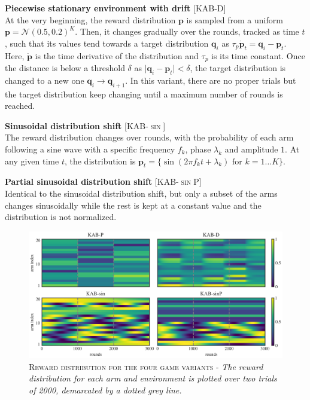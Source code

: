 \hfill \break
\noindent \textbf{Piecewise stationary environment with drift} [\textsc{KAB-D}]\\ At the very beginning, the reward distribution $\mathbf{p}$ is sampled from a uniform $\mathbf{p}=\mathcal{N}(0.5, 0.2)^{K}$. Then, it changes gradually over the rounds, tracked as time $t$, such that its values tend towards a target distribution $\mathbf{q}_{i}$ as $\tau_{p}\dot{\mathbf{p}}_{t}=\mathbf{q}_{i}-\mathbf{p}_{t}$.
Here, $\dot{\mathbf{p}}$ is the time derivative of the distribution and $\tau_{p}$ is its time constant.
Once the distance is below a threshold $\delta$ as $\vert \mathbf{q}_{i} - \mathbf{p}_{t}\vert < \delta$, the target distribution is changed to a new one $\mathbf{q}_{i}\to\mathbf{q}_{i+1}$. In this variant, there are no proper trials but the target distribution keep changing until a maximum number
of rounds is reached.

\hfill \break
\noindent \textbf{Sinusoidal distribution shift} [\textsc{KAB-$\sin$}]\\ The reward distribution changes over rounds, with the probability of each arm following a sine wave with a specific frequency $f_{k}$, phase $\lambda_{k}$ and amplitude $1$. At any given time $t$, the distribution is $\mathbf{p}_{t}=\{\sin(2\pi f_{k} t+\lambda_{k})\text{  for }k=1\ldots K\}$.

\hfill \break
\noindent \textbf{Partial sinusoidal distribution shift} [\textsc{KAB-$\sin$P}]\\ Identical to the sinusoidal distribution shift, but only a subset of the arms changes sinusoidally while the rest is kept at a constant value and the distribution is not normalized.


\begin{figure}[ht]
    \centering
    \includegraphics[width=1.\textwidth]{figures/envs_1.png}
    \caption{\textsc{Reward distribution for the four game variants} - \textit{The reward distribution for each arm and environment is plotted over two trials of 2000, demarcated by a dotted grey line.}}
    \label{fig:envs}
\end{figure}


